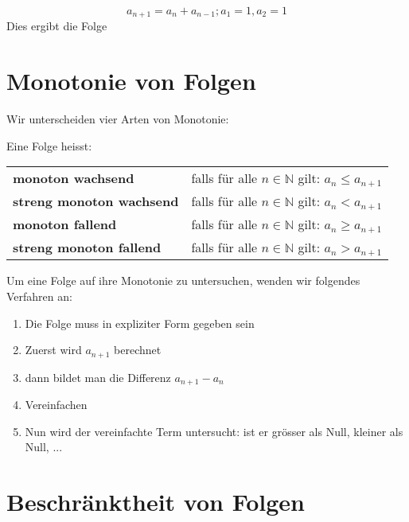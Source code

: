 \begin{example}
\[ a_{n+1} = a_{n} + a_{n-1} ; a_{1} = 1, a_{2} = 1 \]
Dies ergibt die Folge
\begin{gelb}
\vspace{1.5cm}
\end{gelb}
\end{example}

\section{Monotonie von Folgen} %
Wir unterscheiden vier Arten von Monotonie:
\begin{definition}
Eine Folge heisst:

\begin{tabular}{ll}
\textbf{monoton wachsend}& falls für alle $n \in \mathbb{N}$ gilt: $a_{n} \leq a_{n+1}$ \\
\textbf{streng monoton wachsend}& falls für alle $n \in \mathbb{N}$ gilt: $a_{n} < a_{n+1}$  \\
\textbf{monoton fallend}& falls für alle $n \in \mathbb{N}$ gilt: $a_{n} \geq a_{n+1}$ \\
\textbf{streng monoton fallend}& falls für alle $n \in \mathbb{N}$ gilt: $a_{n} > a_{n+1}$  \\
\end{tabular}
\end{definition}

Um eine Folge auf ihre Monotonie zu untersuchen, wenden wir folgendes Verfahren an:
\begin{enumerate}
    \item Die Folge muss in expliziter Form gegeben sein
    \item Zuerst wird $a_{n+1}$ berechnet
    \item dann bildet man die Differenz $a_{n+1}-a_{n}$
    \item Vereinfachen
    \item Nun wird der vereinfachte Term untersucht: ist er grösser als Null, kleiner als Null, ...
\end{enumerate}

\section{Beschränktheit von Folgen}

